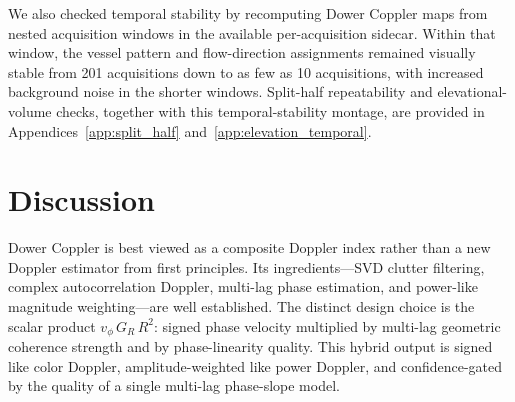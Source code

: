 \documentclass[11pt]{article}
\begin{document}
We also checked temporal stability by recomputing Dower Coppler maps
from nested acquisition windows in the available per-acquisition
sidecar.  Within that window, the vessel pattern and flow-direction
assignments remained visually stable from 201 acquisitions down to as
few as 10 acquisitions, with increased background noise in the shorter
windows.  Split-half repeatability and elevational-volume checks,
together with this temporal-stability montage, are provided in
Appendices~\ref{app:split_half} and~\ref{app:elevation_temporal}.

\section{Discussion}
\label{sec:discussion}

Dower Coppler is best viewed as a composite Doppler index rather than a
new Doppler estimator from first principles.  Its ingredients---SVD
clutter filtering, complex autocorrelation Doppler, multi-lag phase
estimation, and power-like magnitude weighting---are well established.
The distinct design choice is the scalar product
$v_\phi\,G_R\,R^2$: signed phase velocity multiplied by multi-lag
geometric coherence strength and by phase-linearity quality.  This
hybrid output is signed like color Doppler, amplitude-weighted like
power Doppler, and confidence-gated by the quality of a single
multi-lag phase-slope model.
\end{document}
